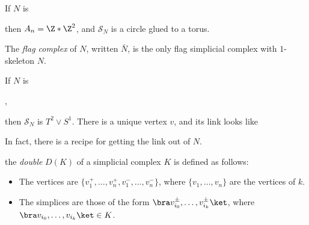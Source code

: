 \documentclass[a4paper]{article}
\begin{document}
\begin{eg}
  If $N$ is
  \begin{center}
  \end{center}
  then $A_n = \Z * \Z^2$, and $\mathcal{S}_N$ is a circle glued to a torus.
\end{eg}

\begin{defi}
  The \emph{flag complex} of $N$, written $\bar{N}$, is the only flag simplicial complex with $1$-skeleton $N$.
\end{defi}

\begin{eg}
  If $N$ is
  \begin{center}
    ,
  \end{center}
  then $\mathcal{S}_N$ is $T^2 \vee S^1$. There is a unique vertex $v$, and its link looks like
  \begin{center}
  \end{center}
\end{eg}
In fact, there is a recipe for getting the link out of $N$.

\begin{defi}[Double]
  the \emph{double} $D(K)$ of a simplicial complex $K$ is defined as follows:
  \begin{itemize}
    \item The vertices are $\{v_1^+, \ldots, v_n^+, v_1^-, \ldots, v_n^-\}$, where $\{v_1, \ldots, v_n\}$ are the vertices of $k$.
    \item The simplices are those of the form $\bra v_{i_0}^{\pm}, \ldots, v_{i_k}^{\pm}\ket$, where $\bra v_{i_0}, \ldots, v_{i_k}\ket \in K$.
  \end{itemize}
\end{defi}
\end{document}
